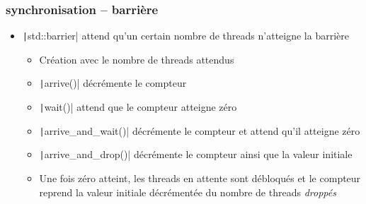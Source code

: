 \documentclass[C++.tex]{subfiles}
\begin{document}
\begin{frame}[fragile]
\end{frame}

\begin{frame}[fragile]
	\frametitle{synchronisation -- barrière}
	\begin{itemize}
		\item \texttt|std::barrier| attend qu'un certain nombre de threads n'atteigne la barrière
		\begin{itemize}
			\item Création avec le nombre de threads attendus
			\item \texttt|arrive()| décrémente le compteur
			\item \texttt|wait()| attend que le compteur atteigne zéro
			\item \texttt|arrive_and_wait()| décrémente le compteur et attend qu'il atteigne zéro
			\item \texttt|arrive_and_drop()| décrémente le compteur ainsi que la valeur initiale
			\item Une fois zéro atteint, les threads en attente sont débloqués et le compteur reprend la valeur initiale décrémentée du nombre de threads \og \textit{droppés}\fg{}
		\end{itemize}
	\end{itemize}


\end{frame}
\end{document}
